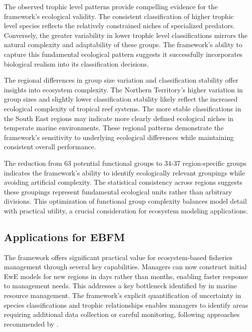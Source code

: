 The observed trophic level patterns provide compelling evidence for the framework's ecological validity. The consistent classification of higher trophic level species reflects the relatively constrained niches of specialized predators. Conversely, the greater variability in lower trophic level classifications mirrors the natural complexity and adaptability of these groups. The framework's ability to capture this fundamental ecological pattern suggests it successfully incorporates biological realism into its classification decisions.

The regional differences in group size variation and classification stability offer insights into ecosystem complexity. The Northern Territory's higher variation in group sizes and slightly lower classification stability likely reflect the increased ecological complexity of tropical reef systems. The more stable classifications in the South East regions may indicate more clearly defined ecological niches in temperate marine environments. These regional patterns demonstrate the framework's sensitivity to underlying ecological differences while maintaining consistent overall performance.

The reduction from 63 potential functional groups to 34-37 region-specific groups indicates the framework's ability to identify ecologically relevant groupings while avoiding artificial complexity. The statistical consistency across regions suggests these groupings represent fundamental ecological units rather than arbitrary divisions. This optimization of functional group complexity balances model detail with practical utility, a crucial consideration for ecosystem modeling applications.

\subsection{Applications for EBFM}

The framework offers significant practical value for ecosystem-based fisheries management through several key capabilities. Managers can now construct initial EwE models for new regions in days rather than months, enabling faster response to management needs. This addresses a key bottleneck identified by \cite{Zheng2023} in marine resource management. The framework's explicit quantification of uncertainty in species classifications and trophic relationships enables managers to identify areas requiring additional data collection or careful monitoring, following approaches recommended by \cite{Kuhn2024}. 

